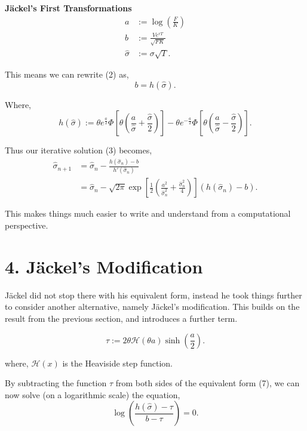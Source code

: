 \documentclass[11pt]{article}
\begin{document}
\textbf{Jäckel's First Transformations}
\begin{align}
    a &:= \log(\frac{F}{K}) \\
    b &:= \frac{Ve^{rT}}{\sqrt{FK}} \\
    \hat{\sigma} &:= \sigma \sqrt{T}.
\end{align}

\newpage

This means we can rewrite (2) as,
\begin{equation}
    b = h(\hat{\sigma}). 
\end{equation} 

Where,
\begin{equation}
    h(\hat{\sigma}) := \theta e^{\frac{a}{2}} \Phi \left[\theta \left( \frac{a}{\hat{\sigma}} + \frac{\hat{\sigma}}{2} \right) \right] - \theta e^{-\frac{a}{2}} \Phi \left[\theta \left( \frac{a}{\hat{\sigma}} - \frac{\hat{\sigma}}{2} \right) \right].
\end{equation}

Thus our iterative solution (3) becomes,
\begin{align}
    \hat{\sigma}_{n+1} &= \hat{\sigma}_n - \frac{h(\hat{\sigma}_n) - b}{h'(\hat{\sigma}_n)} \\
    &= \hat{\sigma}_n - \sqrt{2\pi}\exp \left[ \frac{1}{2} \left( \frac{a^2}{\hat{\sigma}_{n}^{2}} + \frac{\hat{\sigma}_{n}^{2}}{4} \right) \right] (h(\hat{\sigma}_n) - b).
\end{align}

This makes things much easier to write and understand from a computational perspective.

\section*{4. Jäckel's Modification}
Jäckel did not stop there with his equivalent form, instead he took things further to consider another alternative, namely Jäckel's modification. This builds on the result from the previous section, and introduces a further term.

\begin{equation}
    \tau := 2 \theta \mathcal{H}(\theta a) \sinh \left(\frac{a}{2} \right).
\end{equation}

where, $\mathcal{H}(x)$ is the Heaviside step function. 

By subtracting the function $\tau$ from both sides of the equivalent form (7), we can now solve (on a logarithmic scale) the equation,
\begin{equation}
    \log \left( \frac{h(\hat{\sigma}) - \tau}{b - \tau} \right) = 0.
\end{equation}
\end{document}
